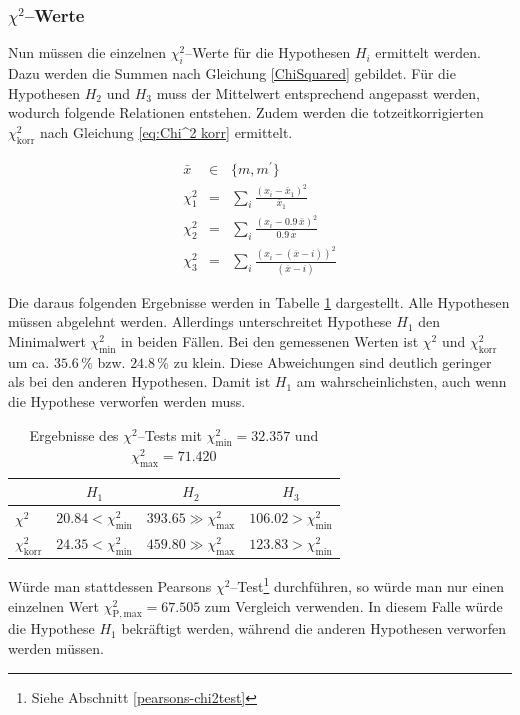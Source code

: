 \documentclass[12pt,a4paper]{scrartcl}
\numberwithin{equation}{section} %
\begin{document}
\subsubsection{$\chi^2$--Werte}
Nun müssen die einzelnen $\chi^2_i$--Werte für die Hypothesen $H_i$ ermittelt werden. Dazu werden die Summen nach Gleichung \eqref{ChiSquared} gebildet. Für die Hypothesen $H_2$ und $H_3$ muss der Mittelwert entsprechend angepasst werden, wodurch folgende Relationen entstehen. Zudem werden die totzeitkorrigierten $\chi^2_\mathrm{korr}$ nach Gleichung \eqref{eq:Chi^2 korr} ermittelt.

\begin{eqnarray}
	\bar x &\in& \{m, m^\prime\} \\
	\chi^2_1 &=& \sum_i \frac{(x_i-\bar x_1)^2}{\bar x_1} \\
	\chi^2_2 &=& \sum_i \frac{(x_i-0.9\,\bar x)^2}{0.9\,\bar x} \\
	\chi^2_3 &=& \sum_i \frac{(x_i-(\bar{x} - i))^2}{(\bar{x} - i)}
\end{eqnarray}

\noindent
Die daraus folgenden Ergebnisse werden in Tabelle \ref{tab:ChiSquared} dargestellt. Alle Hypothesen müssen abgelehnt werden. Allerdings unterschreitet Hypothese $H_1$ den Minimalwert $\chi^2_\mathrm{min}$ in beiden Fällen. Bei den gemessenen Werten ist $\chi^2$ und $\chi^2_\mathrm{korr}$ um ca. $35.6\,\%$ bzw. $24.8\,\%$ zu klein. Diese Abweichungen sind deutlich geringer als bei den anderen Hypothesen. Damit ist $H_1$ am wahrscheinlichsten, auch wenn die Hypothese verworfen werden muss.

\begin{table}[h]
	\centering
	\begin{tabular}{l|c|c|c}
			& $H_1$
			& $H_2$
			& $H_3$ \\
		\hline
		$\chi^2$
			& $20.84 < \chi^2_\mathrm{min}$
			& $393.65 \gg \chi^2_\mathrm{max}$
			& $106.02 > \chi^2_\mathrm{min}$
		\\
		$\chi^2_\mathrm{korr}$
			& $24.35 < \chi^2_\mathrm{min}$
			& $459.80 \gg \chi^2_\mathrm{max}$
			& $123.83 > \chi^2_\mathrm{min}$
	\end{tabular}
	\caption{Ergebnisse des $\chi^2$--Tests mit $\chi^2_\mathrm{min} = 32.357$ und $\chi^2_\mathrm{max} = 71.420$ \cite{Kapur}}
	\label{tab:ChiSquared}
\end{table}

\noindent
Würde man stattdessen Pearsons $\chi^2$--Test\footnote{Siehe Abschnitt \ref{pearsons-chi2test}} durchführen, so würde man nur einen einzelnen Wert $\chi_\mathrm{P, max}^2 = 67.505$ zum Vergleich verwenden. \cite{Kapur} In diesem Falle würde die Hypothese $H_1$ bekräftigt werden, während die anderen Hypothesen verworfen werden müssen.
\end{document}
